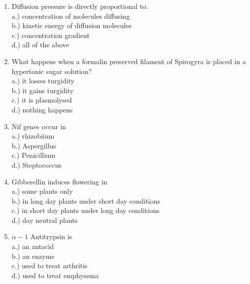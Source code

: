 \documentclass{article}
\begin{document}
\begin{enumerate}
\item \large Diffusion pressure is directly proportional to:\\

		a.) concentration of molecules diffusing \\ b.) kinetic energy of diffusion molecules\\
		c.) concentration gradient\\  d.) all of the above\\

\item \large What happens when a formalin preserved filament of Spirogyra is placed in a hypertonic sugar solution?\\

		a.) it losses turgidity \\ b.) it gains turgidity \\ c.) it is plasmolysed \\ d.) nothing happens\\

\item \large Nif genes occur in\\

		a.) rhizobiium \\ b.) Aspergillus \\ c.) Penicillium \\ d.) Steptococcus\\

\item \large Gibberellin induces flowering in\\

		a.) some plants only\\
		b.) in long day plants under short day conditions\\
		c.) in short day plants under long day conditions\\
		d.) day neutral plants\\

\item \large $\alpha - 1$ Antitrypsin is\\
		a.) an antacid \\ b.) an enzyme \\ c.) used to treat arthritis \\ d.) used to treat emphysema

\end{enumerate}
\end{document}
